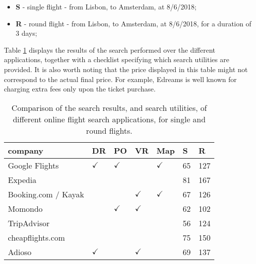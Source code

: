 \begin{itemize}
\item \textbf{S} - single flight - from Lisbon, to Amsterdam, at 8/6/2018;
\item \textbf{R} - round flight - from Lisbon, to Amsterdam, at 8/6/2018, for a duration of 3 days;
\end{itemize}

Table \ref{tab:simple_flights_analysis} displays 
the results of the search performed over the different applications,
together with a checklist specifying which search utilities are provided.
It is also worth noting that the price displayed in this table might not correspond to
the actual final price. For example, Edreams is well known for charging extra fees only upon the ticket purchase. 

\begin{table}[h]
  \centering
  \caption{Comparison of the search results, and search utilities, of different online flight search applications, for single and round flights.}
  \label{tab:simple_flights_analysis}
  \begin{tabular}{|l|l|l|l|l|l|l|}
  \hline
  company             & DR                & PO         & VR         & Map        & S                          & R                           \\ \hline
  Google Flights      & $\checkmark$              & $\checkmark$ &            & $\checkmark$ & 65                         & 127                         \\ \hline
  Expedia             &                              &            &            &            & 81                         & 167                         \\ \hline
  Booking.com / Kayak &                              &            & $\checkmark$ & $\checkmark$ & 67                         & 126                         \\ \hline
  Momondo             &                              & $\checkmark$ & $\checkmark$ &            & 62                         & \cellcolor[HTML]{C0C0C0}102 \\ \hline
  TripAdvisor         &                              &            &            &            & \cellcolor[HTML]{C0C0C0}56 & 124                         \\ \hline
  cheapflights.com    &                              &            &            &            & 75                         & 150                         \\ \hline
  Adioso              & $\checkmark$        &            & $\checkmark$ &            & 69                         & 137                         \\ \hline

\end{tabular}
\end{table}

